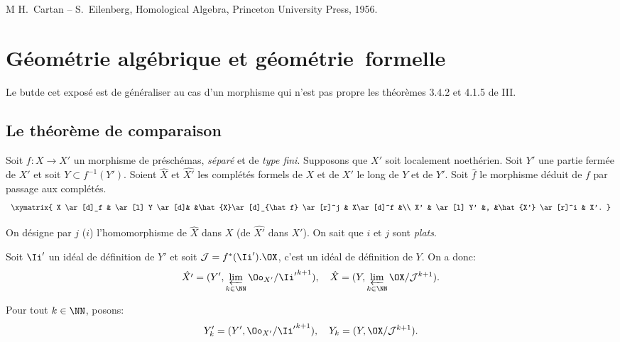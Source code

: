 \begin{thebibliography}{M}
H.~Cartan -- S.~Eilenberg, Homological Algebra, Princeton University Press, 1956.
\end{thebibliography}

\chapter{G\'eom\'etrie alg\'ebrique et g\'eom\'etrie~formelle} \label{IX}

\newcommand{\Ib}{\Ii'}
\newcommand{\Jb}{\mathcal J}

Le but\pageoriginale de cet expos\'e est de g\'en\'eraliser au cas d'un morphisme qui n'est pas propre les th\'eor\`emes 3.4.2 et 4.1.5 de \EGA III.

\section{Le th\'eor\`eme de comparaison} \label{IX.1}

Soit $f\colon X\to X'$ un morphisme de pr\'esch\'emas, \emph{s\'epar\'e} et de \emph{type fini}. Supposons que $X'$ soit localement noeth\'erien. Soit $Y'$ une partie ferm\'ee de $X'$ et soit $Y\subset f^{-1}(Y')$. Soient $\hat{X}$ et $\hat{X'}$ les compl\'et\'es formels de $X$ et de $X'$ le long de $Y$ et de $Y'$. Soit $\hat{f}$ le morphisme d\'eduit de $f$ par passage aux compl\'et\'es.
\begin{equation} \label{eq:IX.1.1}
\begin{array}{c}
\xymatrix{ X \ar[d]_f & \ar[l] Y \ar[d]& &\hat{X}\ar[d]_{\hat f} \ar[r]^j & X\ar[d]^f &\\
X' & \ar[l] Y' &, &\hat{X'} \ar[r]^i & X'.
}
\end{array}
\end{equation}

On d\'esigne par $j$ (\resp $i$) l'homomorphisme de $\hat{X}$ dans $X$ (\resp de $\hat{X'}$ dans $X'$). On sait que $i$ et $j$ sont \emph{plats}.

Soit $\Ii '$ un id\'eal de d\'efinition de $Y'$ et soit ${\Jb}=f^{*}(\Ii '). \OX$, c'est un id\'eal de d\'efinition de $Y$. On a donc:
\begin{equation} \label{eq:IX.1.2} {\hat{X'}=(Y', \varprojlim_{k \in \NN}\Oo_{X'}/{{\Ib}^{k+1}})}, \quad {\hat{X}=(Y, \varprojlim_{k \in \NN}\OX/{{\Jb}^{k+1}})}.
\end{equation}

Pour tout $k \in \NN$, posons:
\begin{equation} \label{eq:IX.1.3} Y'_k=(Y', \Oo_{X'}/{{\Ib}^{k+1}}), \quad {Y_k}=(Y, \OX/{{\Jb}^{k+1}}).
\end{equation}

